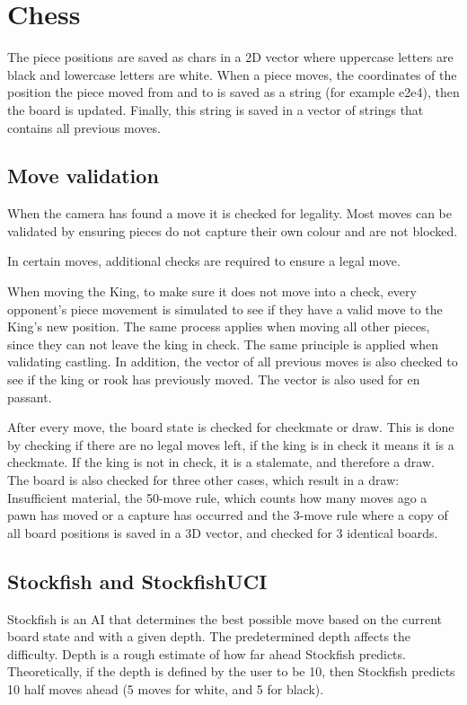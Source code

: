 \section{Chess} \label{sec:Chess}
The piece positions are saved as chars in a 2D vector where uppercase letters are black and lowercase letters are white. When a piece moves, the coordinates of the position the piece moved from and to is saved as a string (for example e2e4), then the board is updated. Finally, this string is saved in a vector of strings that contains all previous moves. 

\subsection{Move validation}
When the camera has found a move it is checked for legality. \cite{chessrules} Most moves can be validated by ensuring pieces do not capture their own colour and are not blocked. 

In certain moves, additional checks are required to ensure a legal move.

When moving the King, to make sure it does not move into a check, every opponent's piece movement is simulated to see if they have a valid move to the King's new position. The same process applies when moving all other pieces, since they can not leave the king in check. The same principle is applied when validating castling. 
In addition, the vector of all previous moves is also checked to see if the king or rook has previously moved. The vector is also used for en passant.

After every move, the board state is checked for checkmate or draw.
This is done by checking if there are no legal moves left, if the king is in check it means it is a checkmate. If the king is not in check, it is a stalemate, and therefore a draw. The board is also checked for three other cases, which result in a draw: Insufficient material, the 50-move rule, which counts how many moves ago a pawn has moved or a capture has occurred and the 3-move rule where a copy of all board positions is saved in a 3D vector, and checked for 3 identical boards.

\subsection{Stockfish and StockfishUCI} 

Stockfish is an AI that determines the best possible move based on the current board state and with a given depth. The predetermined depth affects the difficulty. Depth is a rough estimate of how far ahead Stockfish predicts. Theoretically, if the depth is defined by the user to be 10, then Stockfish predicts 10 half moves ahead (5 moves for white, and 5 for black). \cite{Stockfish} 

